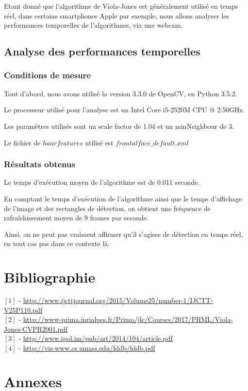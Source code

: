 \documentclass[a4paper,11pt]{article}
\begin{document}
Etant donné que l'algorithme de Viola-Jones est généralement utilisé en temps réel, dans certains smartphones Apple par exemple, nous allons analyser les performances temporelles de l'algorithmes, via une webcam.

\subsection{Analyse des performances temporelles}
\subsubsection{Conditions de mesure}

Tout d'abord, nous avons utilisé la version 3.3.0 de OpenCV, en Python 3.5.2.

Le processeur utilisé pour l'analyse est un Intel Core i5-2520M CPU @ 2.50GHz.

Les paramètres utilisés sont un scale factor de 1.04 et un minNeighbour de 3.

Le fichier de $haar features$ utilisé est $frontalface\_default.xml$

\subsubsection{Résultats obtenus}

Le temps d'exécution moyen de l'algorithme est de 0.011 seconde.

En comptant le temps d'exécution de l'algorithme ainsi que le temps d'affichage de l'image et des rectangles de détection, on obtient une fréquence de rafraîchissement moyen de 9 frames par seconde.

Ainsi, on ne peut pas vraiment affirmer qu'il s'agisse de détection en temps réel, en tout cas pas dans ce contexte là.

\section{Bibliographie}
\flushleft
$[1]$ - \url{http://www.ijcttjournal.org/2015/Volume25/number-1/IJCTT-V25P110.pdf} \\
$[2]$ - \url{http://www-prima.inrialpes.fr/Prima/jlc/Courses/2017/PRML/Viola-Jones-CVPR2001.pdf} \\
$[3]$ - \url{http://www.ipol.im/pub/art/2014/104/article.pdf} \\
$[4]$ - \url{http://vis-www.cs.umass.edu/fddb/fddb.pdf}

\section{Annexes}
    
\end{document}
